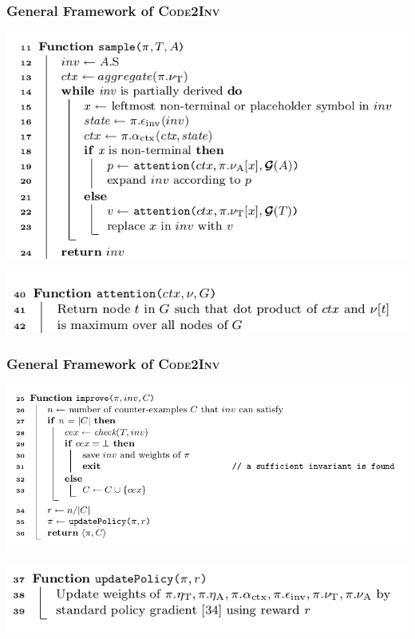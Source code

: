 \documentclass[11pt]{beamer}
\begin{document}
\begin{frame}\frametitle{General Framework of \textsc{Code2Inv}}
\begin{center}

\includegraphics[scale=0.5]{algoSample.png}

\includegraphics[scale=0.5]{algoAttention.png}
\end{center}
\end{frame}
\begin{frame}\frametitle{General Framework of \textsc{Code2Inv}}
\begin{center}

\includegraphics[scale=0.5]{algoImprove.png}

\includegraphics[scale=0.5]{algoUpdate.png}
\end{center}
\end{frame}
\end{document}
